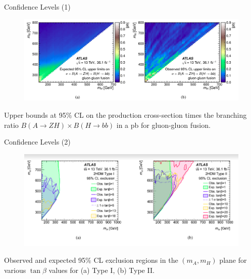 \documentclass[10pt]{beamer} %
\begin{document}
\begin{frame}{Confidence Levels (1)}

    \begin{figure}
        \centering
        \includegraphics[width=1.0\textwidth]{Figs/confindence-levels.png}
    \end{figure}
    Upper bounds at 95\% CL on the production cross-section times the branching ratio $B(A\to ZH) \times B(H \to bb)$ in a pb for gluon-gluon fusion.
\end{frame}



\begin{frame}{Confidence Levels (2)}

\begin{figure}
    \centering
        \includegraphics[width=1.0\textwidth]{Figs/available-regions-1.png}
    \end{figure}
        Observed and expected 95\% CL exclusion regions in the $(m_A, m_H)$ plane for various $\tan \beta$ values for (a) Type I, (b) Type II.

\end{frame}
\end{document}
